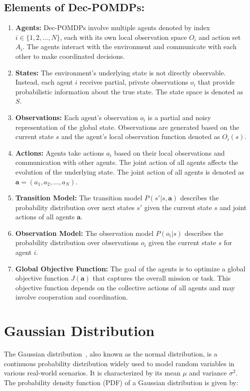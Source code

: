 \subsection{Elements of Dec-POMDPs:}\label{subsec:elements-of-dec-pomdps:}
\begin{enumerate}
    \item \textbf{Agents:} Dec-POMDPs involve multiple agents denoted by index $i \in \{1, 2, \ldots, N\}$, each with its own local observation space $O_i$ and action set $A_i$. The agents interact with the environment and communicate with each other to make coordinated decisions.
    \item \textbf{States:} The environment's underlying state is not directly observable. Instead, each agent $i$ receives partial, private observations $o_i$ that provide probabilistic information about the true state. The state space is denoted as $S$.
    \item \textbf{Observations:} Each agent's observation $o_i$ is a partial and noisy representation of the global state. Observations are generated based on the current state $s$ and the agent's local observation function denoted as $O_i(s)$.
    \item \textbf{Actions:} Agents take actions $a_i$ based on their local observations and communication with other agents. The joint action of all agents affects the evolution of the underlying state. The joint action of all agents is denoted as $\mathbf{a} = (a_1, a_2, \ldots, a_N)$.
    \item \textbf{Transition Model:} The transition model $P(s' | s, \mathbf{a})$ describes the probability distribution over next states $s'$ given the current state $s$ and joint actions of all agents $\mathbf{a}$.
    \item \textbf{Observation Model:} The observation model $P(o_i | s)$ describes the probability distribution over observations $o_i$ given the current state $s$ for agent $i$.
    \item \textbf{Global Objective Function:} The goal of the agents is to optimize a global objective function $J(\mathbf{a})$ that captures the overall mission or task. This objective function depends on the collective actions of all agents and may involve cooperation and coordination.

\end{enumerate}
\pagebreak
\section{Gaussian Distribution}\label{sec:gaussian-distribution}
The Gaussian distribution~, also known as the normal distribution, is a continuous probability distribution widely used to model random variables in various real-world scenarios. It is characterized by its mean $\mu$ and variance $\sigma^2$. The probability density function (PDF) of a Gaussian distribution is given by:

